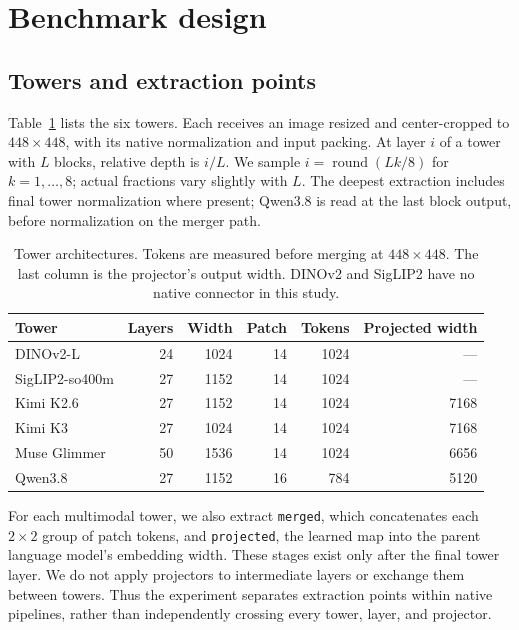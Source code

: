 \section{Benchmark design}
\label{sec:design}
\subsection{Towers and extraction points}
Table~\ref{tab:roster} lists the six towers. Each receives an image resized and
center-cropped to $448\times448$, with its native normalization and input packing.
At layer $i$ of a tower with $L$ blocks, relative depth is $i/L$. We sample
$i=\operatorname{round}(Lk/8)$ for $k=1,\ldots,8$; actual fractions vary slightly with $L$.
The deepest extraction includes final tower normalization where present; Qwen3.8
is read at the last block output, before normalization on the merger path.

\begin{table}[t]
\centering\small
\caption{Tower architectures. Tokens are measured before merging at $448\times448$.
The last column is the projector's output width. DINOv2 and SigLIP2 have no native
connector in this study.}
\label{tab:roster}
\begin{tabular}{lrrrrr}
\toprule
Tower & Layers & Width & Patch & Tokens & Projected width\\
\midrule
DINOv2-L & 24 & 1024 & 14 & 1024 & ---\\
SigLIP2-so400m & 27 & 1152 & 14 & 1024 & ---\\
Kimi K2.6 & 27 & 1152 & 14 & 1024 & 7168\\
Kimi K3 & 27 & 1024 & 14 & 1024 & 7168\\
Muse Glimmer & 50 & 1536 & 14 & 1024 & 6656\\
Qwen3.8 & 27 & 1152 & 16 & 784 & 5120\\
\bottomrule
\end{tabular}
\end{table}

For each multimodal tower, we also extract \texttt{merged}, which concatenates each
$2\times2$ group of patch tokens, and \texttt{projected}, the learned map into the
parent language model's embedding width. These stages exist only after the final tower
layer. We do not apply projectors to intermediate layers or exchange them between towers.
Thus the experiment separates extraction points within native pipelines, rather than
independently crossing every tower, layer, and projector.

